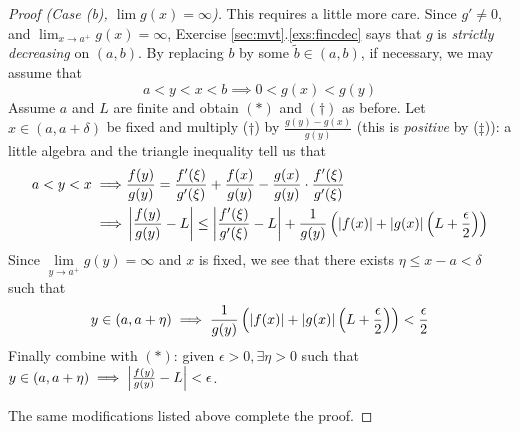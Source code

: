 \begin{proof}[Proof (Case (b), $\lim g(x)=\infty$)]
	This requires a little more care.\footnotemark{} Since $g'\neq 0$, and $\lim_{x\to a^+}g(x)=\infty$, Exercise \ref*{sec:mvt}.\ref*{exs:fincdec} says that $g$ is \emph{strictly decreasing} on $(a,b)$. By replacing $b$ by some $\tilde b\in(a,b)$, if necessary, we may assume that
	\[
		a<y<x<b\implies 0<g(x)<g(y)\tag{\ddag}
	\]
	Assume $a$ and $L$ are finite and obtain $(\ast)$ and $(\dag)$ as before. Let $x\in(a,a+\delta)$ be fixed and multiply ($\dag$) by $\frac{g(y)-g(x)}{g(y)}$ (this is \emph{positive} by ($\ddag$)): a little algebra and the triangle inequality tell us that 
	\begin{align*}
		a<y<x \implies& \frac{f(y)}{g(y)} =\frac{f'(\xi)}{g'(\xi)}+\frac{f(x)}{g(y)}- \frac{g(x)}{g(y)}\cdot\frac{f'(\xi)}{g'(\xi)}\\
		\implies& \left| \frac{f(y)}{g(y)}-L\right|
		\le \left| \frac{f'(\xi)}{g'(\xi)}-L\right| +\frac 1{g(y)}
		\left(\left| f(x)\right|+\left| g(x)\right|\left(L+\frac\epsilon 2\right)\right)
	\end{align*}
	Since $\lim\limits_{y\to a^+}g(y)=\infty$ and $x$ is fixed, we see that there exists $\eta\le x-a<\delta$ such that
	\[
		y\in(a,a+\eta)\implies 
		\frac 1{g(y)}\left(\left| f(x)\right|+\left| g(x)\right|\left(L+\frac\epsilon 2\right)\right) 
		<\frac\epsilon 2
	\]
	Finally combine with $(\ast)$: given $\epsilon>0,\exists \eta>0$ such that $y\in(a,a+\eta)\implies \left| \frac{f(y)}{g(y)}-L\right|<\epsilon$.\par
	The same modifications listed above complete the proof.
\end{proof}





